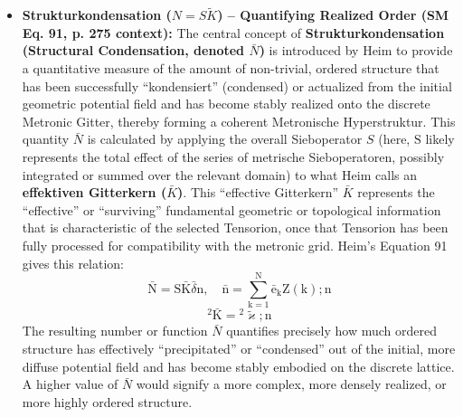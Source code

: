 \documentclass[12pt]{article}
\newcommand{\q}[1]{\enquote{#1}}
\newcommand{\metronintegral}{S}
\begin{document}
\begin{itemize}
    \item \textbf{Strukturkondensation (\( N = \metronintegral\tilde{K} \)) – Quantifying Realized Order (SM Eq. 91, p. 275 context):}
    The central concept of \textbf{Strukturkondensation (Structural Condensation, denoted \( \bar{N} \))} is introduced by Heim to provide a quantitative measure of the amount of non-trivial, ordered structure that has been successfully \q{kondensiert} (condensed) or actualized from the initial geometric potential field and has become stably realized onto the discrete Metronic Gitter, thereby forming a coherent Metronische Hyperstruktur. This quantity \( \bar{N} \) is calculated by applying the overall Sieboperator \( \metronintegral \) (here, \( \mathrm{S} \) likely represents the total effect of the series of metrische Sieboperatoren, possibly integrated or summed over the relevant domain) to what Heim calls an \textbf{effektiven Gitterkern (\( \bar{K} \))}. This \q{effective Gitterkern} \( \bar{K} \) represents the \q{effective} or \q{surviving} fundamental geometric or topological information that is characteristic of the selected Tensorion, once that Tensorion has been fully processed for compatibility with the metronic grid. Heim's Equation 91 gives this relation:
    \begin{equation}
    \bar{\mathrm{N}} = \mathrm{S}\bar{\mathrm{K}}\bar{\delta}\mathrm{n}, \quad \bar{\mathrm{n}} = \sum_{\mathrm{k}=1}^\mathrm{N} \bar{\mathrm{e}}_\mathrm{k} \mathrm{Z}(\mathrm{k});\mathrm{n} \tag{91}
    \label{eq:original_strukturkondensation}
    \end{equation}
    \begin{equation}
    {}^2\bar{\mathrm{K}} = {}^2\tilde{\varkappa};\mathrm{n} \tag{91a}
    \end{equation}
    The resulting number or function \( \bar{N} \) quantifies precisely how much ordered structure has effectively \q{precipitated} or \q{condensed} out of the initial, more diffuse potential field and has become stably embodied on the discrete lattice. A higher value of \( \bar{N} \) would signify a more complex, more densely realized, or more highly ordered structure.


\end{itemize}
\end{document}
